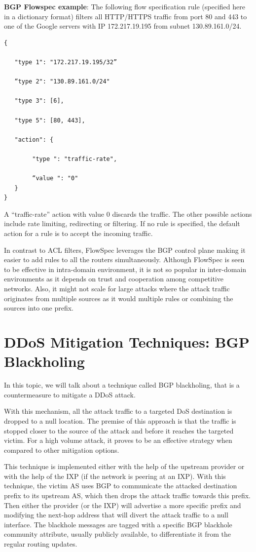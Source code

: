 \documentclass[11pt]{article}
\begin{document}
\textbf{BGP Flowspec example}: The following flow specification rule (specified here in a dictionary format) filters all HTTP/HTTPS traffic from port 80 and 443 to one of the Google servers with IP 172.217.19.195 from subnet 130.89.161.0/24.

\begin{verbatim}
{ 

   "type 1": "172.217.19.195/32”

   “type 2": "130.89.161.0/24" 

   "type 3": [6], 

   "type 5": [80, 443], 

   "action": { 

	    "type ": "traffic-rate", 

	    “value ": "0" 
   }
} 
\end{verbatim}

A “traffic-rate” action with value 0 discards the traffic. The other possible actions include rate limiting, redirecting or filtering. If no rule is specified, the default action for a rule is to accept the incoming traffic. 


In contrast to ACL filters, FlowSpec leverages the BGP control plane making it easier to add rules to all the routers simultaneously. Although FlowSpec is seen to be effective in intra-domain environment, it is not so popular in inter-domain environments as it depends on trust and cooperation among competitive networks. Also, it might not scale for large attacks where the attack traffic originates from multiple sources as it would multiple rules or combining the sources into one prefix. 

\section{DDoS Mitigation Techniques: BGP Blackholing}
\label{sec:org166a85b}

In this topic, we will talk about a technique called BGP blackholing, that is a countermeasure to mitigate a DDoS attack. 

With this mechanism, all the attack traffic to a targeted DoS destination is dropped to a null location. The premise of this approach is that the traffic is stopped closer to the source of the attack and before it reaches the targeted victim. For a high volume attack, it proves to be an effective strategy when compared to other mitigation options. 

This technique is implemented either with the help of the upstream provider or with the help of the IXP (if the network is peering at an IXP). With this technique, the victim AS uses BGP to communicate the attacked destination prefix to its upstream AS, which then drops the attack traffic towards this prefix. Then either the provider (or the IXP) will advertise a more specific prefix and modifying the next-hop address that will divert the attack traffic to a null interface. The blackhole messages are tagged with a specific BGP blackhole community attribute, usually publicly available, to differentiate it from the regular routing updates. 
\end{document}
